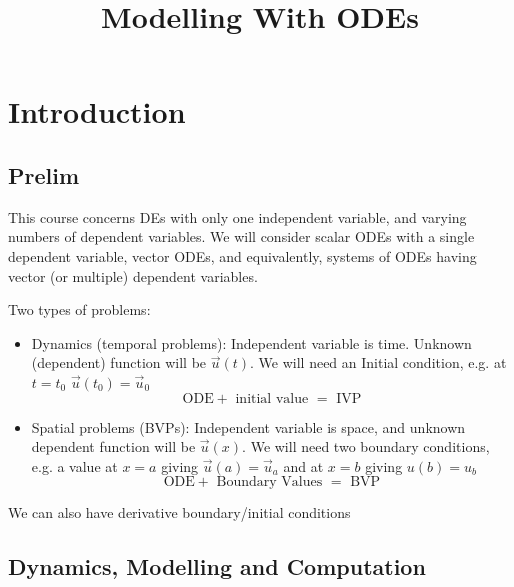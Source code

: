 \documentclass{/home/janmebows/Documents/LatexTemplates/myassignment}
\title{Modelling With ODEs}
\begin{document}
\maketitle

\section{Introduction}
\subsection{Prelim}
This course concerns DEs with only one independent variable, and varying numbers of dependent variables. We will consider scalar ODEs with a single dependent variable, vector ODEs, and equivalently, systems of ODEs having vector (or multiple) dependent variables.


Two types of problems:
\begin{itemize}
    \item Dynamics (temporal problems): Independent variable is time. Unknown (dependent) function will be $\vec{u}(t)$. We will need an Initial condition, e.g. at $t=t_0$ $\vec u(t_0) = \vec u_0$
    \[\text{ODE} + \text{ initial value } = \text{ IVP}\]
    \item Spatial problems (BVPs): Independent variable is space, and unknown dependent function will be $\vec u(x)$. We will need two boundary conditions, e.g. a value at $x=a$ giving  $\vec u(a) = \vec u_a$ and at $x=b$ giving $u(b) = u_b$
    \[\text{ODE} + \text{ Boundary Values } = \text{ BVP}\]
\end{itemize}
We can also have derivative boundary/initial conditions

\subsection{Dynamics, Modelling and Computation}
\end{document}
